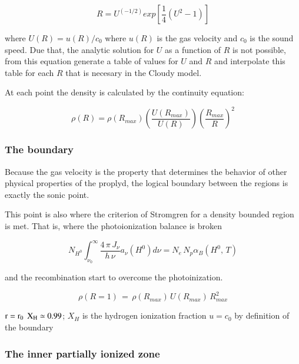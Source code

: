 \documentclass[useAMS,usenatbib]{mn2e}
\begin{document}
\begin{equation}
  R = U^{(-1/2)} exp \left [ \frac{1}{4} \left (U^2 -1 \right )
  \right ]
\end{equation}

where $U(R) = u(R) / c_0$ where $u(R)$ is the gas velocity and $c_0$ is the sound speed. Due that, the analytic solution for $U$ as a function of $R$ is not possible, from this equation generate a table of values for $U$ and $R$ and interpolate this table for each $R$ that is necesary in the Cloudy model.

At each point the density is calculated by the continuity equation:

\begin{equation}
  \rho (R) = \rho (R_{max}) \left ( \frac{U(R_{max})}{U (R)} \right )
    \left ( \frac{R_{max}}{R} \right ) ^2
\end{equation}

\subsubsection{The boundary}
\label{sec:boundary}

Because the gas velocity is the property that determines the behavior of other physical properties of the proplyd, the logical boundary between the regions is exactly the sonic point.

This point is also where the criterion of Stromgren for a density bounded region is met. That is, where the photoionization balance is broken 

\begin{equation}
  N_{H^0} \displaystyle\int_{\nu_0}^{\infty} \frac{4 \, \pi \, J_\nu}{h \, \nu} a_\nu(H^0) d\nu = N_e \, N_p \alpha_B(H^0, \, T)
\end{equation}

and the recombination start to overcome the photoinization.

\begin{equation}
  \rho(R=1) \, = \, \rho(R_{max}) \, U(R_{max}) \, R^2_{max}
\end{equation}

$\rm r = r_0$
$\rm X_H \simeq 0.99$; $X_H$ is the hydrogen ionization fraction
$u = c_0$ by definition of the boundary

\subsubsection{The inner partially ionized zone}
\label{sec:inner}
\end{document}
